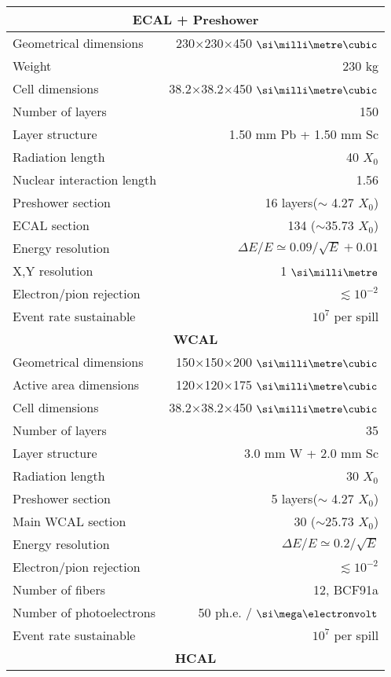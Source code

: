 \begin{longtable}{|l|r|}  
  \hline
  \multicolumn{2}{|c|}{\textbf{ECAL + Preshower}}\\
  \hline
  Geometrical dimensions & 230$\times$230$\times$450 $\mmc$ \\
  Weight & 230 \si{\kilo\gram} \\
  Cell dimensions & 38.2$\times$38.2$\times$450 $\mmc$ \\
  Number of layers & 150  \\
  Layer structure & 1.50 mm Pb + 1.50 mm Sc \\
  Radiation length & 40 $X_0$\\
  Nuclear interaction length & 1.56 \\
  Preshower section & 16 layers($\sim$ 4.27 $X_0$) \\
  ECAL section & 134 ($\sim$35.73 $X_0$) \\
  Energy resolution & $\Delta E / E \simeq 0.09 / \sqrt{E} + 0.01$ \\
  X,Y resolution & 1 $\mmi$ \\
  Electron/pion rejection & $\lesssim 10^{-2}$ \\
  Event rate sustainable & $10^{7}$ per spill \\
  \hline
  \multicolumn{2}{|c|}{\textbf{WCAL}}\\
  \hline
  Geometrical dimensions & 150$\times$150$\times$200 $\mmc$ \\
  Active area dimensions & 120$\times$120$\times$175 $\mmc$ \\  
  Cell dimensions & 38.2$\times$38.2$\times$450 $\mmc$ \\
  Number of layers & 35  \\
  Layer structure & 3.0 mm W + 2.0 mm Sc \\
  Radiation length & 30 $X_0$\\
  Preshower section & 5 layers($\sim$ 4.27 $X_0$) \\
  Main WCAL section & 30 ($\sim$25.73 $X_0$) \\
  Energy resolution & $\Delta E / E \simeq 0.2 / \sqrt{E}$ \\
  Electron/pion rejection & $\lesssim 10^{-2}$ \\
  Number of fibers & 12, BCF91a \\
  Number of photoelectrons &  50 ph.e. / $\mev$\\    
  Event rate sustainable & $10^{7}$ per spill \\  
  \hline
  \multicolumn{2}{|c|}{\textbf{HCAL}}\\

\end{longtable}
